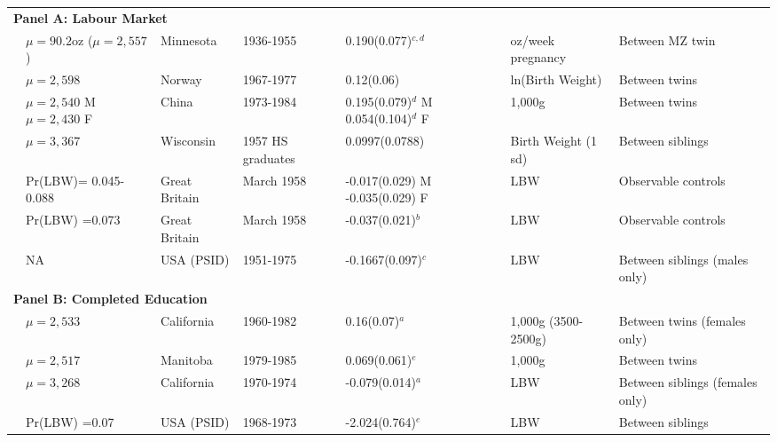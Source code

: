 \documentclass[a4paper, 11pt]{article}
\begin{document}
\begin{landscape}
\begin{longtable}{p{5.5cm}p{2.2cm}p{2cm}p{2cm}p{2.7cm}p{2cm}p{3.4cm}}
    \multicolumn{7}{l}{\textbf{Panel A: Labour Market}} \\
    \citet{BehrmanRosenzweig2004} &$\mu=90.2$oz ($\mu=2,557$)&Minnesota&1936-1955&0.190(0.077)$^{c,d}$&oz/week pregnancy&Between MZ twin\\
    \citet{Blacketal2007} &$\mu=2,598$&Norway&1967-1977&0.12(0.06)&ln(Birth Weight)&Between twins\\
    \citet{RosenzweigZhang2013}&$\mu=2,540$ M $\mu=2,430$ F&China&1973-1984&0.195(0.079)$^{d}$ M 0.054(0.104)$^{d}$ F&1,000g&Between twins\\
    \citet{CookFletcher2015} & $\mu=3,367$&Wisconsin&1957 HS graduates&0.0997(0.0788)&Birth Weight (1 sd)&Between siblings\\
    \citet{CurrieHyson1999} &Pr(LBW)= 0.045-0.088&Great Britain & March 1958 &-0.017(0.029) M -0.035(0.029) F& LBW&Observable controls\\
    \citet{Caseetal2005} &Pr(LBW) =0.073 & Great Britain & March 1958 & -0.037(0.021)$^{b}$& LBW & Observable controls \\
    \citet{JohnsonSchoeni2011} &NA&USA (PSID)&1951-1975&-0.1667(0.097)$^{c}$&LBW&Between siblings (males only) \\
    \multicolumn{7}{l}{\textbf{Panel B: Completed Education}}\\
    \citet{Royer2009}&$\mu=2,533$&California&1960-1982&0.16(0.07)$^{a}$ &1,000g (3500-2500g)&Between twins (females only)\\
    \citet{Oreopoulosetal2008} &$\mu=2,517$&Manitoba&1979-1985&0.069(0.061)$^{e}$&1,000g&Between twins\\
    \citet{CurrieMoretti2007} &$\mu=3,268$&California&1970-1974&-0.079(0.014)$^{a}$&LBW& Between siblings (females only)\\
    \citet{ConleyBennet2000} &Pr(LBW) =0.07&USA (PSID)&1968-1973&-2.024(0.764)$^{e}$&LBW&Between siblings\\
  \end{longtable}
\end{landscape}


\end{document}

